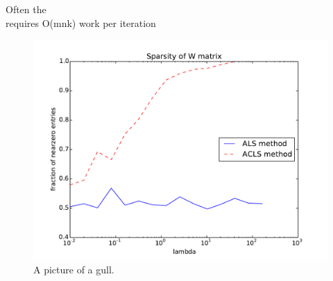 \documentclass[12pt]{article}
\begin{document}
Often the \\
requires O(mnk) work per iteration

\begin{figure}[h!]
  \caption{A picture of a gull.}
  \centering
    \includegraphics{ALS_vs_ACLS_sparsity}
\end{figure}
\end{document}
